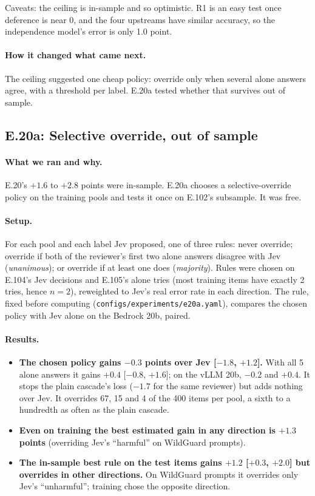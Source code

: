 \documentclass[11pt]{article}
\renewcommand{\_}{\origunderscore\allowbreak}
\begin{document}
Caveats: the ceiling is in-sample and so optimistic. R1 is an easy test once deference is near 0, and the four upstreams have similar accuracy, so the independence model's error is only 1.0 point.

\paragraph{How it changed what came next.}
The ceiling suggested one cheap policy: override only when several alone answers agree, with a threshold per label. E.20a tested whether that survives out of sample.

\subsection{E.20a: Selective override, out of sample}\label{sec:e20a}

\paragraph{What we ran and why.}
E.20's $+1.6$ to $+2.8$ points were in-sample. E.20a chooses a selective-override policy on the training pools and tests it once on E.102's subsample. It was free.

\paragraph{Setup.}
For each pool and each label Jev proposed, one of three rules: never override; override if both of the reviewer's first two alone answers disagree with Jev (\emph{unanimous}); or override if at least one does (\emph{majority}). Rules were chosen on E.104's Jev decisions and E.105's alone tries (most training items have exactly 2 tries, hence $n = 2$), reweighted to Jev's real error rate in each direction. The rule, fixed before computing (\texttt{configs/experiments/e20a.yaml}), compares the chosen policy with Jev alone on the Bedrock 20b, paired.

\paragraph{Results.}
\begin{itemize}[leftmargin=*]
  \item \textbf{The chosen policy gains $-0.3$ points over Jev [$-1.8$, $+1.2$].} With all 5 alone answers it gains $+0.4$ [$-0.8$, $+1.6$]; on the vLLM 20b, $-0.2$ and $+0.4$. It stops the plain cascade's loss ($-1.7$ for the same reviewer) but adds nothing over Jev. It overrides 67, 15 and 4 of the 400 items per pool, a sixth to a hundredth as often as the plain cascade.
  \item \textbf{Even on training the best estimated gain in any direction is $+1.3$ points} (overriding Jev's ``harmful'' on WildGuard prompts).
  \item \textbf{The in-sample best rule on the test items gains $+1.2$ [$+0.3$, $+2.0$] but overrides in other directions.} On WildGuard prompts it overrides only Jev's ``unharmful''; training chose the opposite direction.
\end{itemize}
\end{document}
